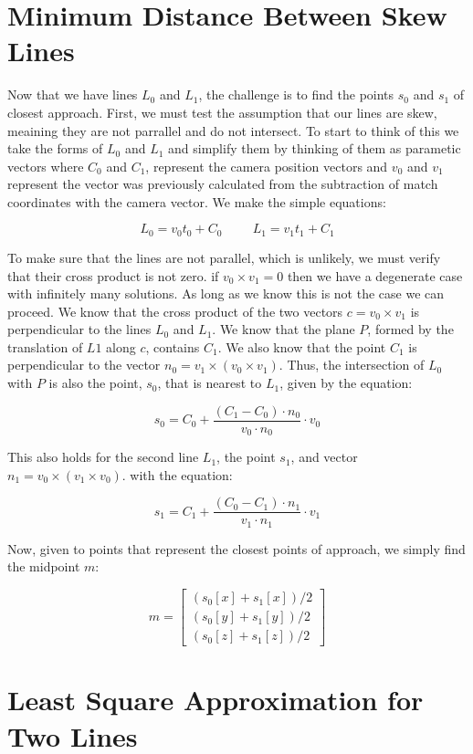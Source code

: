 \section{Minimum Distance Between Skew Lines}
Now that we have lines $L_0$ and $L_1$, the challenge is to find the points $s_0$ and $s_1$ of
closest approach. First, we must test the assumption that our lines are skew, meaining they
are not parrallel and do not intersect. To start to think of this we take the forms of $L_0$ and $L_1$
and simplify them by thinking of them as parametic vectors where $C_0$ and $C_1$, represent the camera
position vectors and $v_0$ and $v_1$ represent the vector was previously calculated from the subtraction
of match coordinates with the camera vector. We make the simple equations:

\[
L_0 = v_0 t_0 + C_0 \hspace{1cm} L_1 = v_1 t_1 + C_1
\]

To make sure that the lines are not parallel, which is unlikely, we must verify that their cross product
is not zero. if $v_0 \times v_1 = 0$ then we have a degenerate case with infinitely many solutions. As long
as we know this is not the case we can proceed. We know that the cross product of the two vectors
$c = v_0 \times v_1$ is perpendicular to the lines $L_0$ and $L_1$. We know that the plane $P$, formed by the
translation of $L1$ along $c$, contains $C_1$. We also know
that the point $C_1$ is perpendicular to the vector $n_0 = v_1 \times (v_0 \times v_1)$. Thus, the intersection
of $L_0$ with $P$ is also the point, $s_0$, that is nearest to $L_1$, given by the equation:

\[
s_0 = C_0 + \frac{(C_1 - C_0) \cdot n_0}{v_0 \cdot n_0} \cdot v_0
\]

This also holds for the second line $L_1$, the point $s_1$, and vector $n_1 = v_0 \times (v_1 \times v_0)$.
with the equation:

\[
s_1 = C_1 + \frac{(C_0 - C_1) \cdot n_1}{v_1 \cdot n_1} \cdot v_1
\]

Now, given to points that represent the closest points of approach, we simply find the midpoint $m$:

\[
m = \begin{bmatrix}
  (s_0[x] + s_1[x])/2\\
  (s_0[y] + s_1[y])/2\\
  (s_0[z] + s_1[z])/2
\end{bmatrix}
\]

\section{Least Square Approximation for Two Lines}
